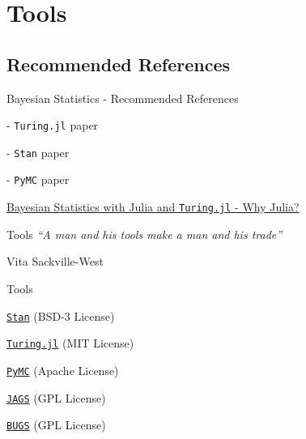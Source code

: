 \section{Tools}

\subsection{Recommended References}
\begin{frame}{Bayesian Statistics - Recommended References}
	\begin{vfilleditems}
		\item \textcite{geTuringLanguageFlexible2018} - \texttt{Turing.jl} paper
		\item \textcite{carpenterStanProbabilisticProgramming2017} - \texttt{Stan} paper
		\item \textcite{pymc3} - \texttt{PyMC} paper
		\item \href{https://storopoli.github.io/Bayesian-Julia/pages/1_why_Julia/}{Bayesian Statistics with Julia and \texttt{Turing.jl} - Why Julia?}
	\end{vfilleditems}
\end{frame}

\begin{frame}{Tools}
	\centering
	\textit{``A man and his tools make a man and his trade''}

	\vspace{2ex}

	Vita Sackville-West
\end{frame}

\begin{frame}{Tools}
	\begin{vfilleditems}
		\item \LARGE  \href{https://mc-stan.org}{\texttt{Stan}} (BSD-3 License)
		\item \LARGE  \href{https://turing.ml}{\texttt{Turing.jl}} (MIT License)
		\item \href{https://www.pymc.io/}{\texttt{PyMC}} (Apache License)
		\item \small \href{https://mcmc-jags.sourceforge.io/}{\texttt{JAGS}} (GPL License)
		\item \footnotesize \href{https://www.mrc-bsu.cam.ac.uk/software/bugs/}{\texttt{BUGS}} (GPL License)
	\end{vfilleditems}
\end{frame}

